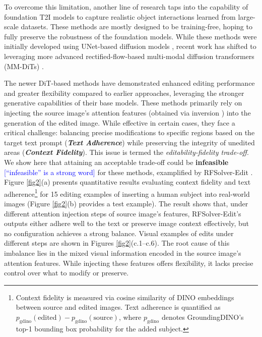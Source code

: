 \documentclass{article}
\newcommand{\kc}[1]{\textcolor{blue}{#1}}
\begin{document}
{To overcome this limitation, another line of research taps into the capability of foundation T2I models to capture realistic object interactions learned from large-scale datasets. These methods are mostly designed to be training-free, hoping to fully preserve the robustness of the foundation models.}
While these methods were initially developed using UNet-based diffusion models \citep{hertz2022prompt, cao2023masactrl, tumanyan2023plug}, recent work has shifted to leveraging more advanced rectified-flow-based multi-modal diffusion transformers (MM-DiTs) \citep{rout2024semantic, wang2024taming, deng2024fireflow, tewel2025addit, zhu2025kv}.



The newer DiT-based methods have demonstrated enhanced editing performance and greater flexibility compared to earlier approaches, leveraging the stronger generative capabilities of their base models. These methods primarily rely on injecting the source image's attention features (obtained via inversion \citep{deng2024fireflow,rout2024semantic,wang2024taming}) into the generation of the edited image. While effective in certain cases, they face a critical challenge: balancing precise modifications to specific regions based on the target text prompt (\textbf{\textit{Text Adherence}}) while preserving the integrity of unedited areas (\textbf{\textit{Context Fidelity}}). This issue is termed the \textit{editability-fidelity trade-off}.  We show here that attaining an acceptable trade-off could be \textbf{infeasible} \kc{[``infeasible'' is a strong word]} for these methods, examplified by RFSolver-Edit \citep{wang2024taming}. Figure \ref{fig2}(a) presents quantitative results evaluating context fidelity and text adherence\footnote{Context fidelity is measured via cosine similarity of DINO embeddings \citep{caron2021emerging} between source and edited images. Text adherence is quantified as \( p_{\text{gdino}}(\text{edited}) - p_{\text{gdino}}(\text{source}) \), where \( p_{\text{gdino}} \) denotes GroundingDINO's \citep{liu2024grounding} top-1 bounding box probability for the added subject.} for 15 editing examples of inserting a human subject into real-world images (Figure \ref{fig2}(b) provides a test example). The result shows that, under different attention injection steps of source image's features, RFSolver-Edit's outputs either adhere well to the text or preserve image context effectively, but no configuration achieves a strong balance. Visual examples of edits under different steps are shown in Figures \ref{fig2}(c.1–c.6). The root cause of this imbalance lies in the mixed visual information encoded in the source image's attention features. While injecting these features offers flexibility, it lacks precise control over what to modify or preserve.
\end{document}
